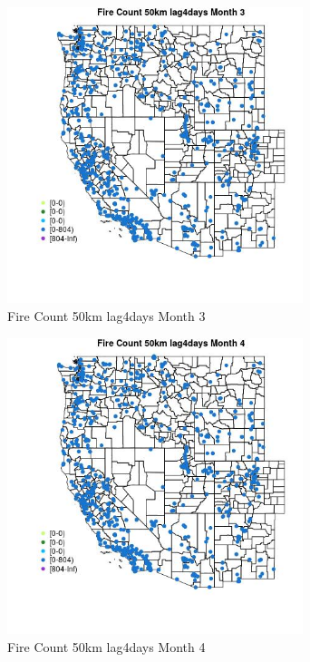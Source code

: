 \begin{figure} 
\centering  
\includegraphics[width=0.77\textwidth]{Code_Outputs/Report_ML_input_PM25_Step4_part_f_de_duplicated_aves_prioritize_24hr_obswNAs_MapObsMo3Fire_Count_50km_lag4days.jpg} 
\caption{\label{fig:Report_ML_input_PM25_Step4_part_f_de_duplicated_aves_prioritize_24hr_obswNAsMapObsMo3Fire_Count_50km_lag4days}Fire Count 50km lag4days Month 3} 
\end{figure} 
 

\clearpage 

\begin{figure} 
\centering  
\includegraphics[width=0.77\textwidth]{Code_Outputs/Report_ML_input_PM25_Step4_part_f_de_duplicated_aves_prioritize_24hr_obswNAs_MapObsMo4Fire_Count_50km_lag4days.jpg} 
\caption{\label{fig:Report_ML_input_PM25_Step4_part_f_de_duplicated_aves_prioritize_24hr_obswNAsMapObsMo4Fire_Count_50km_lag4days}Fire Count 50km lag4days Month 4} 
\end{figure} 
 

